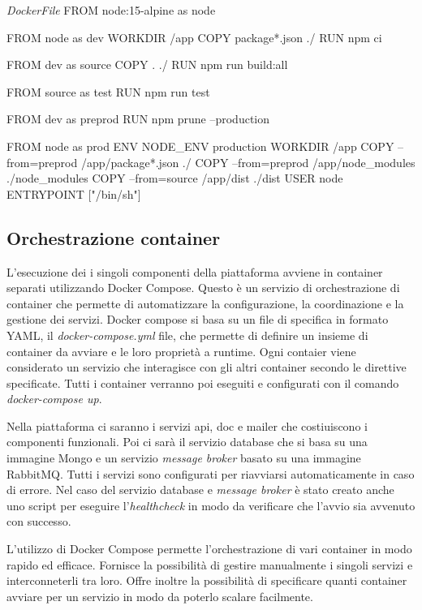 \begin{docker}[label={lst:DockerFile}]
    {\textit{DockerFile}}
    FROM node:15-alpine as node

    FROM node as dev
    WORKDIR /app
    COPY package*.json ./
    RUN npm ci

    FROM dev as source
    COPY . ./
    RUN npm run build:all

    FROM source as test
    RUN npm run test

    FROM dev as preprod
    RUN npm prune --production

    FROM node as prod
    ENV NODE_ENV production
    WORKDIR /app
    COPY --from=preprod /app/package*.json ./
    COPY --from=preprod /app/node_modules ./node_modules
    COPY --from=source /app/dist ./dist
    USER node
    ENTRYPOINT ["/bin/sh"]

\end{docker}

\subsection{Orchestrazione container}
L'esecuzione dei i singoli componenti della piattaforma avviene in container separati utilizzando Docker Compose.
Questo è un servizio di orchestrazione di container che permette di automatizzare la configurazione, la coordinazione
e la gestione dei servizi. Docker compose si basa su un file di specifica in formato YAML, il \textit{docker-compose.yml} file, che
permette di definire un insieme di container da avviare e le loro proprietà a runtime.
Ogni contaier viene considerato un servizio che interagisce con gli altri container secondo
le direttive specificate. Tutti i container verranno poi eseguiti e configurati con il comando \textit{docker-compose up}.

Nella piattaforma ci saranno i servizi api, doc e mailer che costiuiscono i componenti funzionali.
Poi ci sarà il servizio database che si basa su una immagine Mongo e un servizio \textit{message broker} basato su una immagine RabbitMQ.
Tutti i servizi sono configurati per riavviarsi automaticamente in caso di errore. Nel caso del servizio database e \textit{message broker} è stato
creato anche uno script per eseguire l'\textit{healthcheck} in modo da verificare che l'avvio sia avvenuto con successo.

L'utilizzo di Docker Compose permette l'orchestrazione di vari container in modo rapido ed efficace. Fornisce la possibilità
di gestire manualmente i singoli servizi e interconneterli tra loro. Offre inoltre la possibilità di specificare quanti container
avviare per un servizio in modo da poterlo scalare facilmente.


